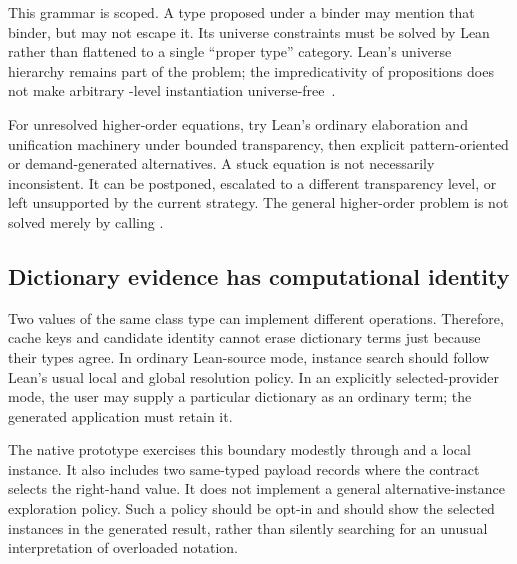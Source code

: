 This grammar is scoped. A type proposed under a binder may mention that binder, but may not escape it. Its universe constraints must be solved by Lean rather than flattened to a single ``proper type'' category. Lean's universe hierarchy remains part of the problem; the impredicativity of propositions does not make arbitrary -level instantiation universe-free~\cite{universes}.

For unresolved higher-order equations, try Lean's ordinary elaboration and unification machinery under bounded transparency, then explicit pattern-oriented or demand-generated alternatives. A stuck equation is not necessarily inconsistent. It can be postponed, escalated to a different transparency level, or left unsupported by the current strategy. The general higher-order problem is not solved merely by calling .

\subsection{Dictionary evidence has computational identity}
Two values of the same class type can implement different operations. Therefore, cache keys and candidate identity cannot erase dictionary terms just because their types agree. In ordinary Lean-source mode, instance search should follow Lean's usual local and global resolution policy. In an explicitly selected-provider mode, the user may supply a particular dictionary as an ordinary term; the generated application must retain it.

The native prototype exercises this boundary modestly through  and a local instance. It also includes two same-typed payload records where the contract selects the right-hand value. It does not implement a general alternative-instance exploration policy. Such a policy should be opt-in and should show the selected instances in the generated result, rather than silently searching for an unusual interpretation of overloaded notation.
